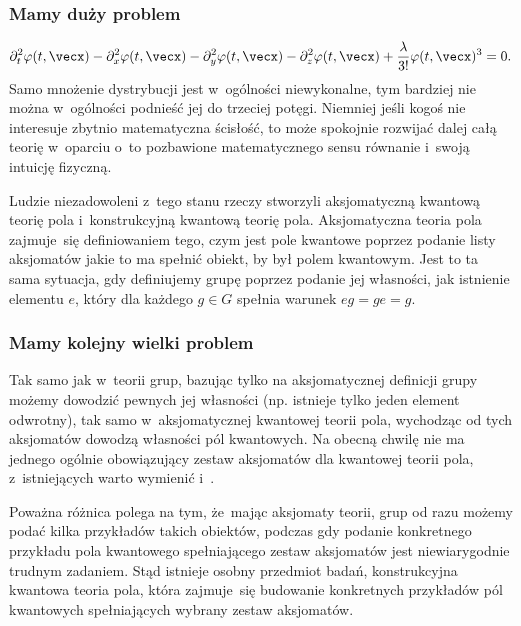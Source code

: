 \documentclass[10pt,t]{beamer}
\begin{document}
\begin{frame}
  \frametitle{Mamy duży problem}

  \vspace{-1.5em}


  \begin{equation}
    \label{eq:Niespodziewane-teoretyczne-01}
    \begin{split}
      \partial_{ t }^{ 2 } \varphi( t, \vecx ) - \partial_{ x }^{ 2 } \varphi( t, \vecx ) -
      \partial_{ y }^{ 2 } \varphi( t, \vecx ) - \partial_{ z }^{ 2 } \varphi( t, \vecx ) +
      \frac{ \lambda }{ 3! } \varphi( t, \vecx )^{ 3 } = 0.
    \end{split}
  \end{equation}
  Samo mnożenie dystrybucji jest w~ogólności niewykonalne, tym bardziej
  nie można w~ogólności podnieść jej do trzeciej potęgi. Niemniej jeśli
  kogoś nie interesuje zbytnio matematyczna ścisłość, to może spokojnie
  rozwijać dalej całą teorię w~oparciu o~to pozbawione matematycznego sensu
  równanie i~swoją intuicję fizyczną.

  Ludzie niezadowoleni z~tego stanu rzeczy stworzyli aksjomatyczną kwantową
  teorię pola i~konstrukcyjną kwantową teorię pola. Aksjomatyczna teoria
  pola zajmuje~się definiowaniem tego, czym jest pole kwantowe poprzez
  podanie listy aksjomatów jakie to ma spełnić obiekt, by był polem
  kwantowym. Jest to ta sama sytuacja, gdy definiujemy grupę poprzez
  podanie jej własności, jak istnienie elementu $e$, który dla każdego
  $g \in G$ spełnia warunek $e g = g e = g$.

\end{frame}





\begin{frame}
  \frametitle{Mamy kolejny wielki problem}


  Tak samo jak w~teorii grup, bazując tylko na aksjomatycznej definicji
  grupy możemy dowodzić pewnych jej własności (np. istnieje tylko jeden
  element odwrotny), tak samo w~aksjomatycznej kwantowej teorii pola,
  wychodząc od tych aksjomatów dowodzą własności pól kwantowych.
  Na obecną chwilę nie ma jednego ogólnie obowiązujący zestaw aksjomatów
  dla kwantowej teorii pola, z~istniejących warto wymienić
  i~.

  Poważna różnica polega na tym, że~mając aksjomaty teorii, grup od razu
  możemy podać kilka przykładów takich obiektów, podczas gdy podanie
  konkretnego przykładu pola kwantowego spełniającego zestaw aksjomatów
  jest niewiarygodnie trudnym zadaniem. Stąd istnieje osobny przedmiot
  badań, konstrukcyjna kwantowa teoria pola, która zajmuje~się
  budowanie konkretnych przykładów pól kwantowych spełniających wybrany
  zestaw aksjomatów.

\end{frame}
\end{document}
